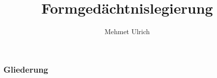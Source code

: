 \documentclass{beamer}
\title{Formgedächtnislegierung}
\author[Mehmet Ulrich]{Mehmet Ulrich}
\begin{document}
\frame{\titlepage}

\begin{frame}
\frametitle{Gliederung}
\tableofcontents[hideallsubsections]
\end{frame}




\end{document}

